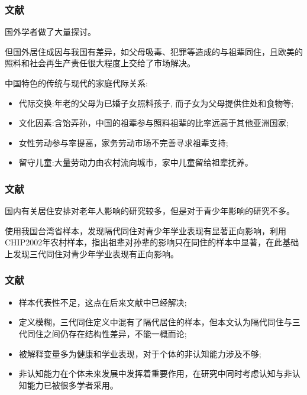 \documentclass{beamer}
\begin{document}
\begin{frame}
\frametitle{文献} 
国外学者做了大量探讨\citep{hayslip_grandparents_2005,monserud_household_2011,westphal_what_2015,jappens_parental_2016,daniela_del_boca_role_2017,zamberletti_grandparents_2018}。
\par 但国外居住成因与我国有差异，如父母吸毒、犯罪等造成的与祖辈同住，且欧美的照料和社会再生产责任很大程度上交给了市场解决。
\par 中国特色的传统与现代的家庭代际关系\citep{shi_2016,ji_2019}:
	\begin{itemize}
		\item 代际交换:年老的父母为已婚子女照料孩子, 而子女为父母提供住处和食物等\citep{wang_2008};
		\item 文化因素:\citep{chu_coresidence_2011}含饴弄孙，中国的祖辈参与照料祖辈的比率远高于其他亚洲国家\citep{zhou_2016};
		\item 女性劳动参与率提高\citep{lv_2016}，家务劳动市场不完善寻求祖辈支持;
		\item 留守儿童:大量劳动力由农村流向城市，家中儿童留给祖辈抚养。
	\end{itemize}
\end{frame}
\begin{frame}
\frametitle{文献} 
	国内有关居住安排对老年人影响的研究较多，但是对于青少年影响的研究不多\citep{pong_co-resident_2010,zeng_effects_2014,liang_2017,he_childhood_2018,张帆2020}。
	\par \citet{pong_co-resident_2010}使用我国台湾省样本，发现隔代同住对青少年学业表现有显著正向影响，\citet{zeng_effects_2014}利用CHIP2002年农村样本，指出祖辈对孙辈的影响只在同住的样本中显著，在此基础上\citet{张帆2020}发现三代同住对青少年学业表现有正向影响。
		
\end{frame}

\begin{frame}
\frametitle{文献} 
	\begin{itemize}
			\item 样本代表性不足\citep{pong_co-resident_2010}，这点在后来文献中已经解决;
			\item 定义模糊，\citet{张帆2020}三代同住定义中混有了隔代居住的样本，但本文认为隔代同住与三代同住之间仍存在结构性差异，不能一概而论;
			\item 被解释变量多为健康\citep{liang_2017,he_childhood_2018}和学业表现\citep{张帆2020}，对于个体的非认知能力涉及不够;
			\item 非认知能力在个体未来发展中发挥着重要作用\citep{heckman_effects_2006,kautz_fostering_2014,赖德胜_2020}，在研究中同时考虑认知与非认知能力已被很多学者采用\citep{huang_2017,le_2017}。
	\end{itemize}

\end{frame}
\end{document}
